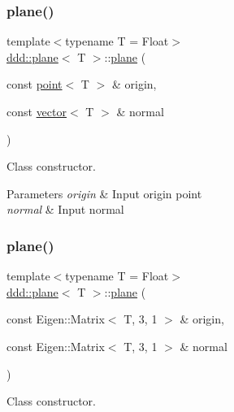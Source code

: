 \subsubsection{\texorpdfstring{plane()}{plane()}\hspace{0.1cm}{\footnotesize\ttfamily [1/2]}}
{\footnotesize\ttfamily template$<$typename T = Float$>$ \\
\hyperlink{classddd_1_1plane}{ddd\+::plane}$<$ T $>$\+::\hyperlink{classddd_1_1plane}{plane} (\begin{DoxyParamCaption}\item[{const \hyperlink{classddd_1_1point}{point}$<$ T $>$ \&}]{origin,  }\item[{const \hyperlink{classddd_1_1vector}{vector}$<$ T $>$ \&}]{normal }\end{DoxyParamCaption})\hspace{0.3cm}{\ttfamily [inline]}}



Class constructor. 


\begin{DoxyParams}{Parameters}
{\em origin} & Input origin point \\
\hline
{\em normal} & Input normal \\
\hline
\end{DoxyParams}
\mbox{\label{classddd_1_1plane_a7d7d2a60448312343451246052d157c5}} 
\subsubsection{\texorpdfstring{plane()}{plane()}\hspace{0.1cm}{\footnotesize\ttfamily [2/2]}}
{\footnotesize\ttfamily template$<$typename T = Float$>$ \\
\hyperlink{classddd_1_1plane}{ddd\+::plane}$<$ T $>$\+::\hyperlink{classddd_1_1plane}{plane} (\begin{DoxyParamCaption}\item[{const Eigen\+::\+Matrix$<$ T, 3, 1 $>$ \&}]{origin,  }\item[{const Eigen\+::\+Matrix$<$ T, 3, 1 $>$ \&}]{normal }\end{DoxyParamCaption})\hspace{0.3cm}{\ttfamily [inline]}}



Class constructor. 


